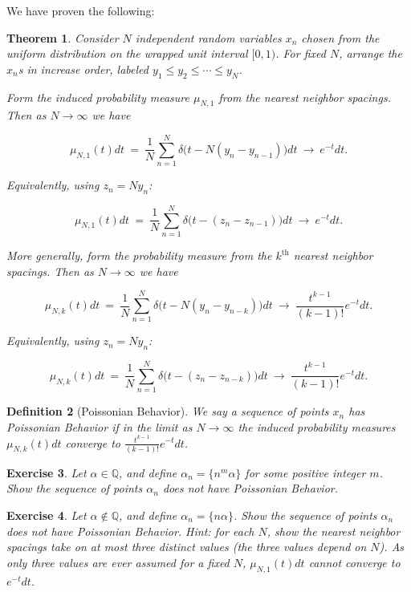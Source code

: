 \documentclass[12pt,letterpaper]{report}
\newcommand\be{\begin{equation}}
\newcommand\ee{\end{equation}}
\newcommand{\Q}{\mathbb{Q}}
\newtheorem{thm}{Theorem}[section]
\newtheorem{defi}[thm]{Definition}
\newtheorem{exe}[thm]{Exercise}
\begin{document}
We have proven the following:

\begin{thm} Consider $N$ independent random variables $x_n$ chosen
from the uniform distribution on the wrapped unit interval
$[0,1)$. For fixed $N$, arrange the $x_n$s in increase order,
labeled $y_1 \le y_2 \le \cdots \le y_N$.

Form the induced probability measure $\mu_{N,1}$ from the nearest
neighbor spacings. Then as $N \to \infty$ we have

\be \mu_{N,1}(t)dt \ = \ \frac{1}{N} \sum_{n=1}^N \delta\Big(t -
N(y_n - y_{n-1})\Big)dt \ \to \ e^{-t}dt. \ee

Equivalently, using $z_n = N y_n$:

\be \mu_{N,1}(t)dt \ = \ \frac{1}{N} \sum_{n=1}^N \delta\Big(t -
(z_n - z_{n-1})\Big)dt \ \to \ e^{-t}dt. \ee

More generally, form the probability measure from the
$k^{\text{th}}$ nearest neighbor spacings. Then as $N \to \infty$
we have

\be \mu_{N,k}(t)dt \ = \ \frac{1}{N} \sum_{n=1}^N \delta\Big(t -
N(y_{n} - y_{n-k})\Big)dt \ \to \ \frac{t^{k-1}}{(k-1)!}e^{-t}dt.
\ee

Equivalently, using $z_n = N y_n$:

\be \mu_{N,k}(t)dt \ = \ \frac{1}{N} \sum_{n=1}^N \delta\Big(t -
(z_n - z_{n-k})\Big)dt \ \to \ \frac{t^{k-1}}{(k-1)!} e^{-t}dt.
\ee
\end{thm}

\begin{defi}[Poissonian Behavior] We say a sequence of points
$x_n$ has Poissonian Behavior if in the limit as $N \to \infty$
the induced probability measures $\mu_{N,k}(t)dt$ converge to
$\frac{t^{k-1}}{(k-1)!} e^{-t}dt$. \end{defi}

\begin{exe} Let $\alpha \in \Q$, and define $\alpha_n = \{n^m \alpha\}$
for some positive integer $m$. Show the sequence of points
$\alpha_n$ does not have Poissonian Behavior. \end{exe}

\begin{exe} Let $\alpha \not\in \Q$, and define $\alpha_n =
\{n \alpha\}$. Show the sequence of points $\alpha_n$ does not
have Poissonian Behavior. Hint: for each $N$, show the nearest
neighbor spacings take on at most three distinct values (the three
values depend on $N$). As only three values are ever assumed for a
fixed $N$, $\mu_{N,1}(t)dt$ cannot converge to $e^{-t}dt$.
\end{exe}
\end{document}
